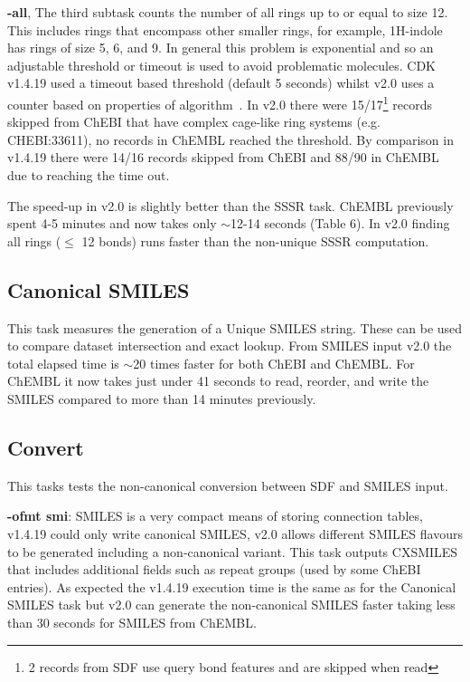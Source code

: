 \documentclass[doublespacing]{bmcart}
\def \cdkversion {v2.0}
\begin{document}
\textbf{-all}, The third subtask counts the number of all rings up to or equal
to size 12. This includes rings that encompass other smaller rings, for 
example, 1H-indole has rings of size 5, 6, and 9. In general this problem is 
exponential and so an adjustable threshold or timeout is used to avoid problematic 
molecules. CDK v1.4.19 used a timeout based threshold (default 5 seconds) 
whilst \cdkversion{} uses a 
counter based on properties of algorithm~\cite{May2014}. In \cdkversion{} there
were 15/17\footnote{2 records from SDF use query bond features and are skipped
when read} records skipped from ChEBI that have complex cage-like ring systems 
(e.g. CHEBI:33611), no records in ChEMBL reached the threshold. By comparison in
v1.4.19 there were 14/16 records skipped from ChEBI and 88/90 in ChEMBL due to
reaching the time out.

The speed-up in \cdkversion{} is slightly better than the SSSR task. ChEMBL 
previously spent 4-5 minutes and now takes only $\sim$12-14 seconds (Table 6).
In \cdkversion{} finding all rings ($\leq$ 12 bonds) runs faster than the 
non-unique SSSR computation.

\subsection*{Canonical SMILES}

This task measures the generation of a Unique SMILES string. These can be
used to compare dataset intersection and exact lookup. From SMILES input
\cdkversion{} the total elapsed time is $\sim$20 times faster for both ChEBI
and ChEMBL. For ChEMBL it now takes just under 41 seconds to read, reorder, 
and write the SMILES compared to more than 14 minutes previously.

\subsection*{Convert}

This tasks tests the non-canonical conversion between SDF and SMILES input.

\textbf{-ofmt smi}: SMILES is a very compact means of storing connection tables, v1.4.19 could 
only write canonical SMILES, \cdkversion{} allows different SMILES flavours 
to be generated including a non-canonical variant. This task outputs
CXSMILES that includes additional fields such as repeat groups (used by some 
ChEBI entries). As
expected the v1.4.19 execution time is the same as for the Canonical SMILES 
task but \cdkversion{} can generate the non-canonical SMILES faster taking less
than 30 seconds for SMILES from ChEMBL. 
\end{document}
